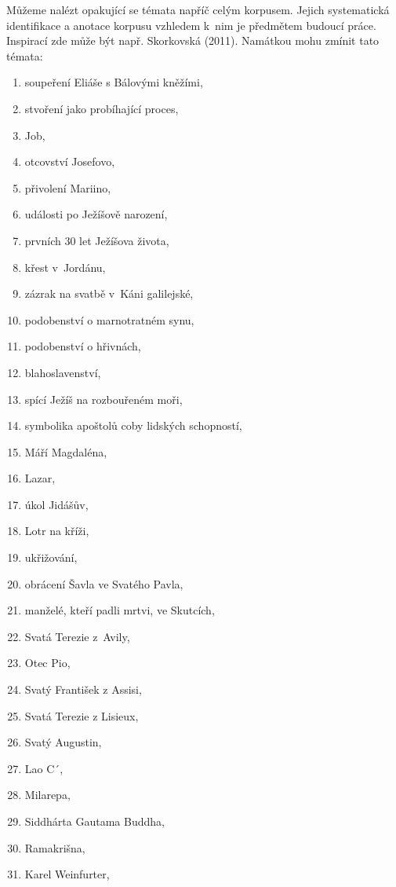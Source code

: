 Můžeme nalézt opakující se témata napříč celým korpusem. Jejich systematická
identifikace a anotace korpusu vzhledem k~nim je předmětem budoucí práce.
Inspirací zde může být např. Skorkovská (2011)\cite{skorkovska2011automatic}.
Namátkou mohu zmínit tato témata:

\begin{enumerate}
\item{soupeření Eliáše s Bálovými kněžími,}
\item{stvoření jako probíhající proces,}
\item{Job,}

\item{otcovství Josefovo,}
\item{přivolení Mariino,}
\item{události po Ježíšově narození,}
\item{prvních 30 let Ježíšova života,}
\item{křest v~Jordánu,}
\item{zázrak na svatbě v~Káni galilejské,}
\item{podobenství o marnotratném synu,}
\item{podobenství o hřivnách,}
\item{blahoslavenství,}
\item{spící Ježíš na rozbouřeném moři,}
\item{symbolika apoštolů coby lidských schopností,}
\item{Máří Magdaléna,}
\item{Lazar,}
\item{úkol Jidášův,}
\item{Lotr na kříži,}
\item{ukřižování,}

\item{obrácení Šavla ve Svatého Pavla,}
\item{manželé, kteří padli mrtvi, ve Skutcích,}

\item{Svatá Terezie z~Avily,}
\item{Otec Pio,}
\item{Svatý František z Assisi,}
\item{Svatá Terezie z Lisieux,}
\item{Svatý Augustin,}

\item{Lao C´,}
\item{Milarepa,}
\item{Siddhárta Gautama Buddha,}
\item{Ramakrišna,}
\item{Karel Weinfurter,}


\end{enumerate}

